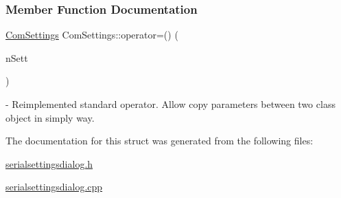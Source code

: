 \subsubsection{Member Function Documentation}
{\footnotesize\ttfamily \mbox{\hyperlink{structComSettings}{Com\+Settings}} Com\+Settings\+::\texorpdfstring{operator=()}{operator=()} (\begin{DoxyParamCaption}\item[{\mbox{\hyperlink{structComSettings}{Com\+Settings}}}]{n\+Sett }\end{DoxyParamCaption})} - Reimplemented standard operator. Allow copy parameters between two class object in simply way.

The documentation for this struct was generated from the following files\+:\begin{DoxyCompactItemize}
\item 
\mbox{\hyperlink{serialsettingsdialog_8h}{serialsettingsdialog.\+h}}\item 
\mbox{\hyperlink{serialsettingsdialog_8cpp}{serialsettingsdialog.\+cpp}}\end{DoxyCompactItemize}
\newpage
